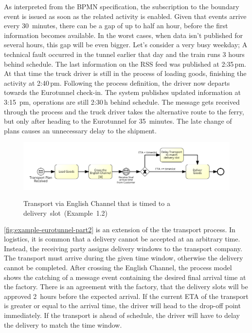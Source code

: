 As interpreted from the BPMN specification, the subscription to the boundary event is issued as soon as the related activity is enabled.
Given that events arrive every 30~minutes, there can be a gap of up to half an hour, before the first information becomes available.
In the worst cases, when data isn't published for several hours, this gap will be even bigger.
Let's consider a very busy weekday; A technical fault occurred in the tunnel earlier that day and the train runs 3 hours behind schedule.
The last information on the RSS feed was published at 2:35\,pm. At that time the truck driver is still in the process of loading goods, finishing the activity at 2:40\,pm.
Following the process definition, the driver now departs towards the Eurotunnel check-in.
The system publishes updated information at 3:15~pm, operations are still 2:30\,h behind schedule. The message gets received through the process and the truck driver takes the alternative route to the ferry, but only after heading to the Eurotunnel for 35~minutes. The late change of plans causes an unnecessary delay to the shipment.

\begin{figure}[]
	\myfloatalign
	{\includegraphics[width=1\linewidth]{chapters/requirements/Eurotunnel_part2.png}}
	\caption{Transport via English Channel that is timed to a delivery~slot~(Example~1.2)}
	\label{fig:example-eurotunnel-part2}
\end{figure}

\autoref{fig:example-eurotunnel-part2} is an extension of the the transport process.
In logistics, it is common that a delivery cannot be accepted at an arbitrary time. Instead, the receiving party assigns delivery windows to the transport company.
The transport must arrive during the given time window, otherwise the delivery cannot be completed.
After crossing the English Channel, the process model shows the catching of a message event containing the desired final arrival time at the factory. There is an agreement with the factory, that the delivery slots will be approved 2~hours before the expected arrival.
If the current ETA of the transport is greater or equal to the arrival time, the driver will head to the drop-off point immediately. If the transport is ahead of schedule, the driver will have to delay the delivery to match the time window.

